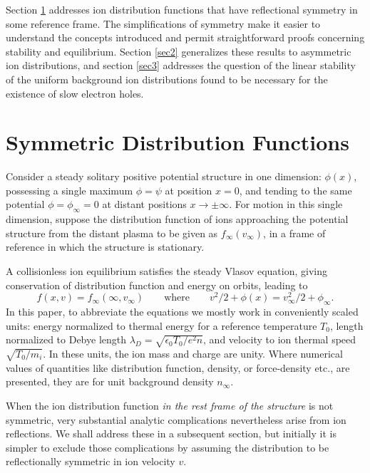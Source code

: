 \documentclass[12pt]{article}
\begin{document}
Section \ref{sec1} addresses ion distribution functions that have
reflectional symmetry in some reference frame. The simplifications of
symmetry make it easier to understand the concepts introduced and
permit straightforward proofs concerning stability and
equilibrium. Section \ref{sec2} generalizes these results to
asymmetric ion distributions, and section \ref{sec3} addresses the
question of the linear stability of the uniform background ion
distributions found to be necessary for the existence of slow electron
holes.


\section{Symmetric Distribution Functions}\label{sec1}


Consider a steady solitary positive potential structure in one
dimension: $\phi(x)$, possessing a single maximum $\phi=\psi$ at
position $x=0$, and tending to the same potential $\phi=\phi_\infty=0$
at distant positions $x\to \pm \infty$. For motion in this single
dimension, suppose the distribution function of ions approaching the
potential structure from the distant plasma to be given as
$f_\infty(v_\infty)$, in a frame of reference in which the structure
is stationary.

 A collisionless ion equilibrium
satisfies the steady Vlasov equation, giving conservation of
distribution function and energy on orbits, leading to
\begin{equation}
  f(x,v)=f_\infty(\infty,v_\infty) \qquad\mbox{where}\qquad 
  v^2/2+\phi(x) = v_\infty^2/2+\phi_\infty. 
\end{equation}
In this paper, to abbreviate the equations we mostly work in
conveniently scaled units: energy normalized to thermal energy for a
reference temperature $T_0$, length normalized to Debye length
$\lambda_D=\sqrt{\epsilon_0 T_0/e^2n}$, and velocity to ion thermal
speed $\sqrt{T_0/m_i}$. In these units, the ion mass and charge are
unity. Where numerical values of quantities like distribution
function, density, or force-density etc., are presented, they are for
unit background density $n_\infty$.

When the ion distribution function \emph{in the rest frame of the
  structure} is not symmetric, very substantial analytic complications
nevertheless arise from ion reflections. We shall address these in a
subsequent section, but initially it is simpler to exclude those
complications by assuming the distribution to be reflectionally
symmetric in ion velocity $v$.
\end{document}
